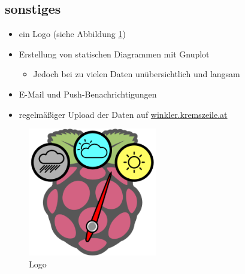 \subsection{sonstiges}
\label{subsec:sonstiges}

\begin{itemize}
	\item ein Logo (siehe Abbildung \ref{fig:logo})
	\item Erstellung von statischen Diagrammen mit \gls{Gnuplot}
	\begin{itemize}
		\item Jedoch bei zu vielen Daten unübersichtlich und langsam
	\end{itemize}
	\item E-Mail und Push-Benachrichtigungen
	\item regelmäßiger Upload der Daten auf \href{http://winkler.kremszeile.at}{winkler.kremszeile.at}
\end{itemize}

\begin{figure}[h]
  \centering
     \includegraphics[width=0.5\textwidth]{figures/logo.png}
  \caption{Logo}
  \label{fig:logo}
\end{figure}